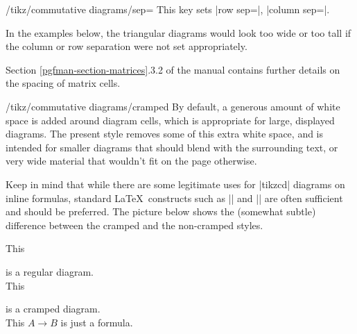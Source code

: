 \documentclass[a4paper]{ltxdoc}
\begin{document}
\begin{key}{/tikz/commutative diagrams/sep=}
  This key sets |row sep=|, |column sep=|.
\end{key}

In the examples below, the triangular diagrams would look too wide or
too tall if the column or row separation were not set appropriately.

\begin{codeexample}[]
\end{codeexample}

\begin{codeexample}[]
\end{codeexample}

Section \ref*{pgfman-section-matrices}.3.2 of the \pgfname{} manual
\cite{pgfman} contains further details on the spacing of matrix cells.

\begin{stylekey}{/tikz/commutative diagrams/cramped}
  By default, a generous amount of white space is added around diagram
  cells, which is appropriate for large, displayed diagrams.  The
  present style removes some of this extra white space, and is
  intended for smaller diagrams that should blend with the surrounding
  text, or very wide material that wouldn't fit on the page otherwise.
\end{stylekey}

Keep in mind that while there are some legitimate uses for |{tikzcd}|
diagrams on inline formulas, standard \LaTeX\ constructs such as
|\overset| and |\xrigthtarrow| are often sufficient and should be
preferred.  The picture below shows the (somewhat subtle) difference
between the cramped and the non-cramped styles.

\begin{codeexample}[pre=\minipage{6cm},post=\endminipage]
This  is a regular diagram.\\
This  is a cramped diagram.\\
This $A \to B$ is just a formula.
\end{codeexample}
\end{document}
